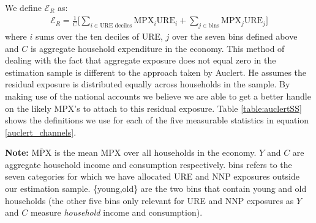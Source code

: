 \documentclass[titlepage]{\econtex}\newcommand{\texname}{ConsumptionHeterogeneity}
\begin{document}
We define $\mathcal{E}_R$ as:
\begin{align}
\mathcal{E}_R = \frac{1}{C}\Bigg[ \sum_{i \in \text{URE deciles} } \text{MPX}_i \text{URE}_i + \sum_{j \in \text{bins}} \text{MPX}_j \text{URE}_j \Bigg]
\end{align}
where $i$ sums over the ten deciles of URE, $j$ over the seven bins defined above and $C$ is aggregate household expenditure in the economy. This method of dealing with the fact that aggregate exposure does not equal zero in the estimation sample is different to the approach taken by Auclert. He assumes the residual exposure is distributed equally across households in the sample. By making use of the national accounts we believe we are able to get a better handle on the likely MPX's to attach to this residual exposure. Table \ref{table:auclertSS} shows the definitions we use for each of the five measurable statistics in equation \ref{auclert_channels}.

\begin{minipage}{1.0\textwidth}
	\begin{center}
		\label{table:auclertSS}
	\end{center}
	\tiny \textbf{Note: } $\overline{\text{MPX}}$ is the mean MPX over all households in the economy. $Y$ and $C$ are aggregate household income and consumption respectively. bins refers to the seven categories for which we have allocated URE and NNP exposures outside our estimation sample. \{young,old\} are the two bins that contain young and old households (the other five bins only relevant for URE and NNP exposures as $Y$ and $C$ measure \textit{household} income and consumption).
\end{minipage}
\end{document}
